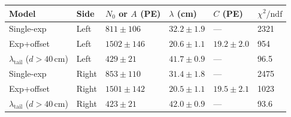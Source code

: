 \begin{tabular}{llllll}\toprule
Model & Side & $N_0$ or $A$ (PE) & $\lambda$ (cm) & $C$ (PE) & $\chi^2/\mathrm{ndf}$ \\
\midrule
Single-exp & Left & $811\pm106$ & $32.2\pm1.9$ & --- & 2321 \\
Exp+offset & Left & $1502\pm146$ & $20.6\pm1.1$ & $19.2\pm2.0$ & 954 \\
$\lambda_\mathrm{tail}$ ($d>40$\,cm) & Left & $429\pm21$ & $41.7\pm0.9$ & --- & 96.5 \\
Single-exp & Right & $853\pm110$ & $31.4\pm1.8$ & --- & 2475 \\
Exp+offset & Right & $1501\pm142$ & $20.5\pm1.1$ & $19.5\pm2.1$ & 1023 \\
$\lambda_\mathrm{tail}$ ($d>40$\,cm) & Right & $423\pm21$ & $42.0\pm0.9$ & --- & 93.6 \\
\bottomrule\end{tabular}
